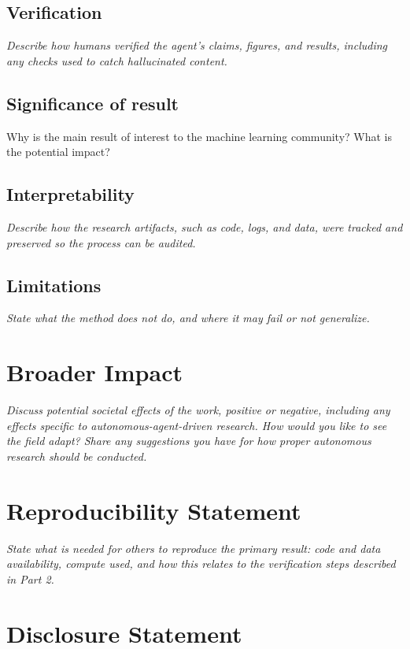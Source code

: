 \documentclass{article}
\begin{document}
\subsection{Verification}
\textit{Describe how humans verified the agent's claims, figures, and results,
including any checks used to catch hallucinated content.}


\subsection{Significance of result}
Why is the main result of interest to the machine learning community? What is the potential impact?


\subsection{Interpretability}
\textit{Describe how the research artifacts, such as code, logs, and data,
were tracked and preserved so the process can be audited.}



\subsection{Limitations}
\textit{State what the method does not do, and where it may fail or not
generalize.}




\section{Broader Impact}
\textit{Discuss potential societal effects of the work, positive or negative, including any effects specific to autonomous-agent-driven research. How would you like to see the field adapt? Share any suggestions you have for how proper
autonomous research should be conducted.}


\clearpage
\appendix

\section{Reproducibility Statement}
\textit{State what is needed for others to reproduce the primary result: code
and data availability, compute used, and how this relates to the verification
steps described in Part 2.}


\section{Disclosure Statement}
\end{document}

